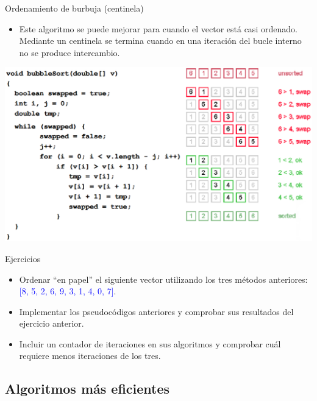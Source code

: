 \documentclass{beamer} %
\newcommand{\blue}[1]{\textcolor{blue}{#1}}
\begin{document}
\begin{frame}{Ordenamiento de burbuja (centinela)}
    \begin{itemize}
        \item {\footnotesize Este algoritmo se puede mejorar para cuando el vector está casi ordenado. Mediante un centinela se termina cuando en una iteración del bucle interno no se produce intercambio.}
    \end{itemize}
    \begin{center}
        \includegraphics[width=.9\textwidth]{./image/cap5/bubble-sort2.png}
    \end{center}
\end{frame}

\begin{frame}{Ejercicios}
    \begin{itemize}
        \item Ordenar ``en papel'' el siguiente vector utilizando los tres métodos anteriores: \blue{[8, 5, 2, 6, 9, 3, 1, 4, 0, 7]}.
        \item Implementar los pseudocódigos anteriores y comprobar sus resultados del ejercicio anterior.
        \item Incluir un contador de iteraciones en sus algoritmos y comprobar cuál requiere menos iteraciones de los tres.
    \end{itemize}
\end{frame}

\subsection{Algoritmos más eficientes}
\end{document}
